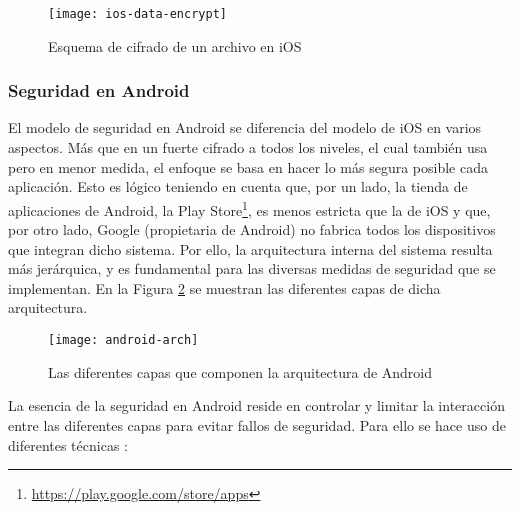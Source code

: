 \begin{figure}[H]
	\centering
	\texttt{[image: ios-data-encrypt]}
	\caption{Esquema de cifrado de un archivo en iOS}
	\label{fig:ios-data-encrypt}
\end{figure}

\subsubsection{Seguridad en Android}

El modelo de seguridad en Android se diferencia del modelo de iOS en varios aspectos. Más que en un fuerte cifrado a todos los niveles, el cual también usa pero en menor medida, el enfoque se basa en hacer lo más segura posible cada aplicación. Esto es lógico teniendo en cuenta que, por un lado, la tienda de aplicaciones de Android, la Play Store\footnote{\url{https://play.google.com/store/apps}}, es menos estricta que la de iOS y que, por otro lado, Google (propietaria de Android) no fabrica todos los dispositivos que integran dicho sistema. Por ello, la arquitectura interna del sistema resulta más jerárquica, y es fundamental para las diversas medidas de seguridad que se implementan. En la Figura \ref{fig:android-arch} se muestran las diferentes capas de dicha arquitectura. 

\begin{figure}[H]
	\centering
	\texttt{[image: android-arch]}
	\caption{Las diferentes capas que componen la arquitectura de Android}
	\label{fig:android-arch}
\end{figure}

La esencia de la seguridad en Android reside en controlar y limitar la interacción entre las diferentes capas para evitar fallos de seguridad. Para ello se hace uso de diferentes técnicas \cite{android-sec-guide} \cite{jspdcp-2014}:


